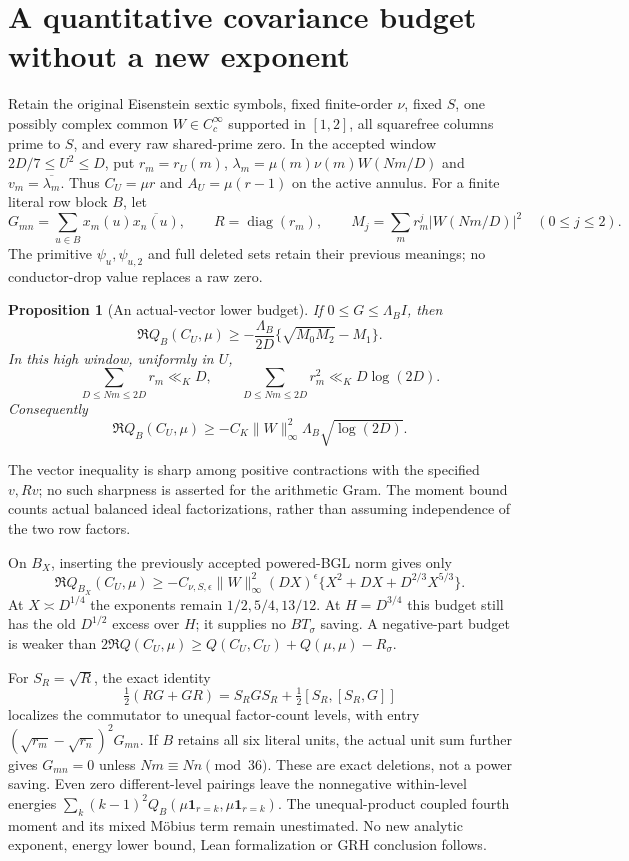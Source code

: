 \documentclass[11pt]{article}
\newtheorem{proposition}[theorem]{Proposition}
\begin{document}
\section{A quantitative covariance budget without a new exponent}\label{cbq:core}
Retain the original Eisenstein sextic symbols, fixed finite-order $\nu$,
fixed $S$, one possibly complex common $W\in C_c^\infty$ supported in
$[1,2]$, all squarefree columns prime to $S$, and every raw shared-prime
zero. In the accepted window $2D/7\le U^2\le D$, put $r_m=r_U(m)$,
$\lambda_m=\mu(m)\nu(m)W(Nm/D)$ and $v_m=\overline{\lambda_m}$.
Thus $C_U=\mu r$ and $A_U=\mu(r-1)$ on the active annulus.
For a finite literal row block $B$, let
\[
 G_{mn}=\sum_{u\in B}x_m(u)\overline{x_n(u)},\qquad
 R=\operatorname{diag}(r_m),\qquad
 M_j=\sum_mr_m^j|W(Nm/D)|^2\quad(0\le j\le2).
\]
The primitive $\psi_u,\psi_{u,2}$ and full deleted sets retain their
previous meanings; no conductor-drop value replaces a raw zero.

\begin{proposition}[An actual-vector lower budget]\label{cbq:budget}
If $0\le G\le\Lambda_B I$, then
\begin{equation}\label{cbq:vector}
 \Re Q_B(C_U,\mu)\ge
 -\frac{\Lambda_B}{2D}\{\sqrt{M_0M_2}-M_1\}.
\end{equation}
In this high window, uniformly in $U$,
\begin{equation}\label{cbq:moments}
 \sum_{D\le Nm\le2D}r_m\ll_K D,\qquad
 \sum_{D\le Nm\le2D}r_m^2\ll_K D\log(2D).
\end{equation}
Consequently
\[
 \Re Q_B(C_U,\mu)\ge
 -C_K\|W\|_\infty^2\Lambda_B\sqrt{\log(2D)}.
\]
\end{proposition}
The vector inequality is sharp among positive contractions with the
specified $v,Rv$; no such sharpness is asserted for the arithmetic Gram.
The moment bound counts actual balanced ideal factorizations, rather than
assuming independence of the two row factors.

On $B_X$, inserting the previously accepted powered-BGL norm gives only
\[
 \Re Q_{B_X}(C_U,\mu)\ge
 -C_{\nu,S,\epsilon}\|W\|_\infty^2(DX)^\epsilon
 \{X^2+DX+D^{2/3}X^{5/3}\}.
\]
At $X\asymp D^{1/4}$ the exponents remain $1/2,5/4,13/12$.
At $H=D^{3/4}$ this budget still has the old $D^{1/2}$ excess over $H$;
it supplies no $BT_\sigma$ saving. A negative-part budget is weaker than
$2\Re Q(C_U,\mu)\ge Q(C_U,C_U)+Q(\mu,\mu)-R_\sigma$.

For $S_R=\sqrt R$, the exact identity
\[
 \tfrac12(RG+GR)=S_RGS_R+\tfrac12[S_R,[S_R,G]]
\]
localizes the commutator to unequal factor-count levels, with entry
$(\sqrt{r_m}-\sqrt{r_n})^2G_{mn}$. If $B$ retains all six literal units,
the actual unit sum further gives $G_{mn}=0$ unless $Nm\equiv Nn\pmod{36}$.
These are exact deletions, not a power saving. Even zero different-level
pairings leave the nonnegative within-level energies
$\sum_k(k-1)^2Q_B(\mu\mathbf1_{r=k},\mu\mathbf1_{r=k})$.
The unequal-product coupled fourth moment and its mixed M\"obius term
remain unestimated. No new analytic exponent, energy lower bound,
Lean formalization or GRH conclusion follows.
\end{document}
